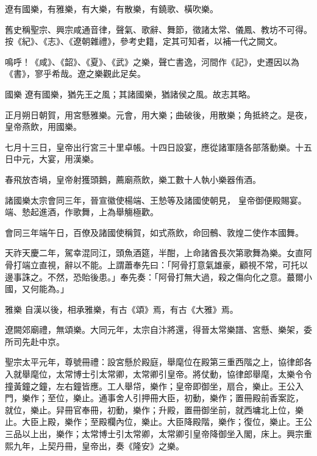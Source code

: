 
\begin{pinyinscope}

 遼有國樂，有雅樂，有大樂，有散樂，有鐃歌、橫吹樂。



 舊史稱聖宗、興宗咸通音律，聲氣、歌辭、舞節，徵諸太常、儀鳳、教坊不可得。按《紀》、《志》、《遼朝雜禮》，參考史籍，定其可知者，以補一代之闕文。



 鳴呼！《咸》、《韶》、《夏》、《武》之樂，聲亡書逸，河間作《記》，史遷因以為《書》，寥乎希哉。遼之樂觀此足矣。



 國樂
 遼有國樂，猶先王之風；其諸國樂，猶諸侯之風。故志其略。



 正月朔日朝賀，用宮懸雅樂。元會，用大樂；曲破後，用散樂；角抵終之。是夜，皇帝燕飲，用國樂。



 七月十三日，皇帝出行宮三十里卓帳。十四日設宴，應從諸軍隨各部落動樂。十五日中元，大宴，用漢樂。



 春飛放杏堝，皇帝射獲頭鵝，薦廟燕飲，樂工數十人執小樂器侑酒。



 諸國樂太宗會同三年，晉宣徽使楊端、王慹等及諸國使朝見，
 皇帝御便殿賜宴。端、慹起進酒，作歌舞，上為舉觴極歡。



 會同三年端午日，百僚及諸國使稱賀，如式燕飲，命回鶻、敦煌二使作本國舞。



 天祚天慶二年，駕幸混同江，頭魚酒筵，半酣，上命諸酋長次第歌舞為樂。女直阿骨打端立直視，辭以不能。上謂蕭奉先曰：「阿骨打意氣雄豪，顧視不常，可托以邊事誅之。不然，恐貽後患。」奉先奏：「阿骨打無大過，殺之傷向化之意。蕞爾小國，又何能為。」



 雅樂
 自漢以後，相承雅樂，有古《頌》焉，有古《大雅》焉。



 遼闕郊廟禮，無頌樂。大同元年，太宗自汴將還，得晉太常樂譜、宮懸、樂架，委所司先赴中京。



 聖宗太平元年，尊號冊禮：設宮懸於殿庭，舉麾位在殿第三重西階之上，協律郎各入就舉麾位，太常博士引太常卿，太常卿引皇帝。將仗動，協律郎舉麾，太樂令令撞黃鐘之鐘，左右鐘皆應。工人舉帒，樂作；皇帝即御坐，扇合，樂止。王公入門，樂作；至位，樂止。通事舍人引押冊大臣，初動，樂作；置冊殿前香案訖，
 就位，樂止。舁冊官奉冊，初動，樂作；升殿，置冊御坐前，就西墉北上位，樂止。大臣上殿，樂作；至殿欄內位，樂止。大臣降殿階，樂作；復位，樂止。王公三品以上出，樂作；太常博士引太常卿，太常卿引皇帝降御坐入閣，床上。興宗重熙九年，上契丹冊，皇帝出，奏《隆安》之樂。




\end{pinyinscope}
